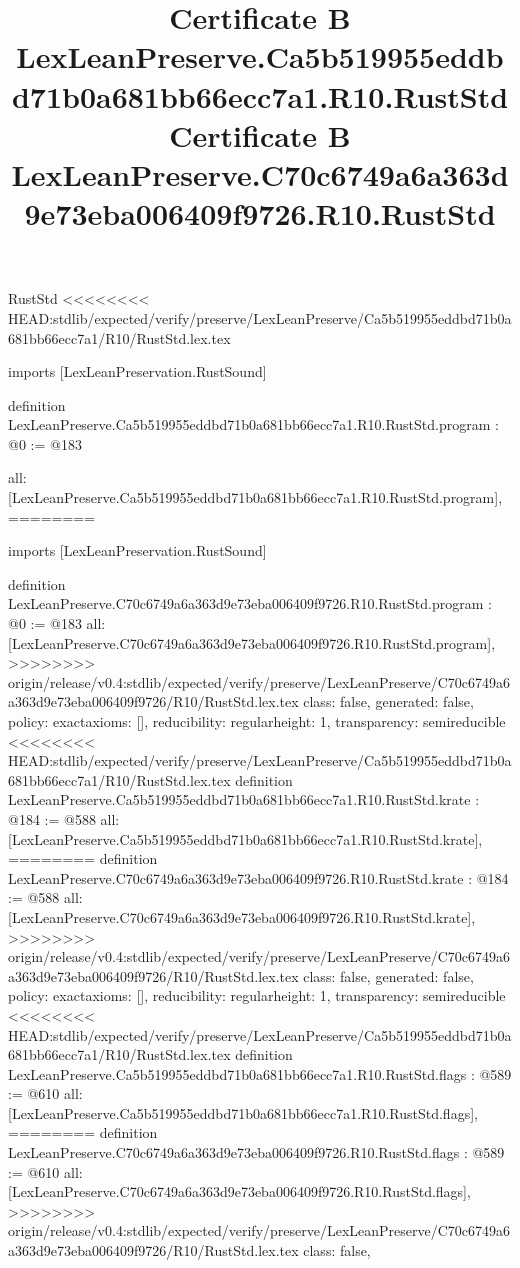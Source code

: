 \begin{lexlean}{RustStd}
<<<<<<<< HEAD:stdlib/expected/verify/preserve/LexLeanPreserve/Ca5b519955eddbd71b0a681bb66ecc7a1/R10/RustStd.lex.tex
\title{Certificate B LexLeanPreserve.Ca5b519955eddbd71b0a681bb66ecc7a1.R10.RustStd}
\begin{coremodule}
imports [LexLeanPreservation.RustSound]

definition LexLeanPreserve.Ca5b519955eddbd71b0a681bb66ecc7a1.R10.RustStd.program : @0 := @183 {
  all: [LexLeanPreserve.Ca5b519955eddbd71b0a681bb66ecc7a1.R10.RustStd.program],
========
\title{Certificate B LexLeanPreserve.C70c6749a6a363d9e73eba006409f9726.R10.RustStd}
\begin{coremodule}
imports [LexLeanPreservation.RustSound]

definition LexLeanPreserve.C70c6749a6a363d9e73eba006409f9726.R10.RustStd.program : @0 := @183 {
  all: [LexLeanPreserve.C70c6749a6a363d9e73eba006409f9726.R10.RustStd.program],
>>>>>>>> origin/release/v0.4:stdlib/expected/verify/preserve/LexLeanPreserve/C70c6749a6a363d9e73eba006409f9726/R10/RustStd.lex.tex
  class: false,
  generated: false,
  policy: exact{axioms: []},
  reducibility: regular{height: 1},
  transparency: semireducible
}
<<<<<<<< HEAD:stdlib/expected/verify/preserve/LexLeanPreserve/Ca5b519955eddbd71b0a681bb66ecc7a1/R10/RustStd.lex.tex
definition LexLeanPreserve.Ca5b519955eddbd71b0a681bb66ecc7a1.R10.RustStd.krate : @184 := @588 {
  all: [LexLeanPreserve.Ca5b519955eddbd71b0a681bb66ecc7a1.R10.RustStd.krate],
========
definition LexLeanPreserve.C70c6749a6a363d9e73eba006409f9726.R10.RustStd.krate : @184 := @588 {
  all: [LexLeanPreserve.C70c6749a6a363d9e73eba006409f9726.R10.RustStd.krate],
>>>>>>>> origin/release/v0.4:stdlib/expected/verify/preserve/LexLeanPreserve/C70c6749a6a363d9e73eba006409f9726/R10/RustStd.lex.tex
  class: false,
  generated: false,
  policy: exact{axioms: []},
  reducibility: regular{height: 1},
  transparency: semireducible
}
<<<<<<<< HEAD:stdlib/expected/verify/preserve/LexLeanPreserve/Ca5b519955eddbd71b0a681bb66ecc7a1/R10/RustStd.lex.tex
definition LexLeanPreserve.Ca5b519955eddbd71b0a681bb66ecc7a1.R10.RustStd.flags : @589 := @610 {
  all: [LexLeanPreserve.Ca5b519955eddbd71b0a681bb66ecc7a1.R10.RustStd.flags],
========
definition LexLeanPreserve.C70c6749a6a363d9e73eba006409f9726.R10.RustStd.flags : @589 := @610 {
  all: [LexLeanPreserve.C70c6749a6a363d9e73eba006409f9726.R10.RustStd.flags],
>>>>>>>> origin/release/v0.4:stdlib/expected/verify/preserve/LexLeanPreserve/C70c6749a6a363d9e73eba006409f9726/R10/RustStd.lex.tex
  class: false,
}}}
\end{coremodule}}
\end{coremodule}
\end{lexlean}
